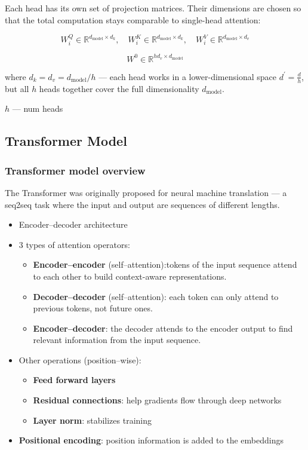 \documentclass[10pt]{article}
\begin{document}
Each head has its own set of projection matrices.
Their dimensions are chosen so that the total computation stays comparable to single-head attention:

\begin{equation*}
W_{i}^{Q} \in \mathbb{R}^{d_{\text{model}} \times d_{k}}, \quad
W_{i}^{K} \in \mathbb{R}^{d_{\text{model}} \times d_{k}}, \quad
W_{i}^{V} \in \mathbb{R}^{d_{\text{model}} \times d_{v}}
\end{equation*}

\begin{equation*}
W^{0} \in \mathbb{R}^{h d_{v} \times d_{\text{model}}}
\end{equation*}

where $d_k = d_v = d_{\text{model}} / h$ --- each head works in a lower-dimensional space $d^{\prime} = \frac{d}{h}$, but all $h$ heads together
cover the full dimensionality $d_{\text{model}}$.

$h$ --- num heads


\newpage
\subsection{Transformer Model}

\subsubsection{Transformer model overview}

The Transformer was originally proposed for neural machine translation --- a seq2seq task where the input and output are sequences of different lengths.

\begin{itemize}
    \item Encoder--decoder architecture
    \item 3 types of attention operators:
    \begin{itemize}
        \item \textbf {Encoder--encoder} (self--attention):tokens of the input sequence attend to each other to build context-aware representations.
        \item \textbf {Decoder--decoder} (self--attention): each token can only attend to previous tokens, not future ones.
        \item \textbf {Encoder--decoder}: the decoder attends to the encoder output to find relevant information from the input sequence.
    \end{itemize}
    \item Other operations (position--wise):
    \begin{itemize}
        \item \textbf {Feed forward layers}
        \item \textbf {Residual connections}: help gradients flow through deep networks
        \item \textbf {Layer norm}: stabilizes training
    \end{itemize}
    \item \textbf {Positional encoding}: position information is added to the embeddings
\end{itemize}
\end{document}

